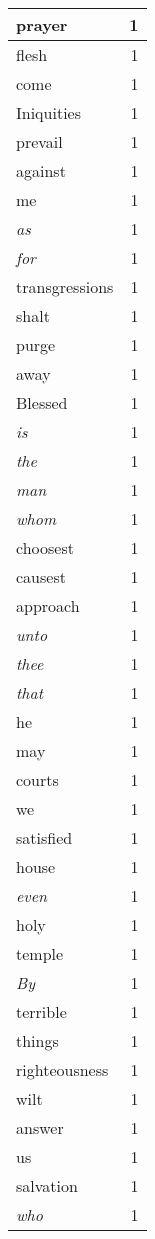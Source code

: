 \begin{center}
\begin{longtable}{l|r}
prayer & 1 \\ \hline
flesh & 1 \\ \hline
come & 1 \\ \hline
Iniquities & 1 \\ \hline
prevail & 1 \\ \hline
against & 1 \\ \hline
me & 1 \\ \hline
\emph{as} & 1 \\ \hline
\emph{for} & 1 \\ \hline
transgressions & 1 \\ \hline
shalt & 1 \\ \hline
purge & 1 \\ \hline
away & 1 \\ \hline
Blessed & 1 \\ \hline
\emph{is} & 1 \\ \hline
\emph{the} & 1 \\ \hline
\emph{man} & 1 \\ \hline
\emph{whom} & 1 \\ \hline
choosest & 1 \\ \hline
causest & 1 \\ \hline
approach & 1 \\ \hline
\emph{unto} & 1 \\ \hline
\emph{thee} & 1 \\ \hline
\emph{that} & 1 \\ \hline
he & 1 \\ \hline
may & 1 \\ \hline
courts & 1 \\ \hline
we & 1 \\ \hline
satisfied & 1 \\ \hline
house & 1 \\ \hline
\emph{even} & 1 \\ \hline
holy & 1 \\ \hline
temple & 1 \\ \hline
\emph{By} & 1 \\ \hline
terrible & 1 \\ \hline
things & 1 \\ \hline
righteousness & 1 \\ \hline
wilt & 1 \\ \hline
answer & 1 \\ \hline
us & 1 \\ \hline
salvation & 1 \\ \hline
\emph{who} & 1 \\ \hline

\end{longtable}
\end{center}
